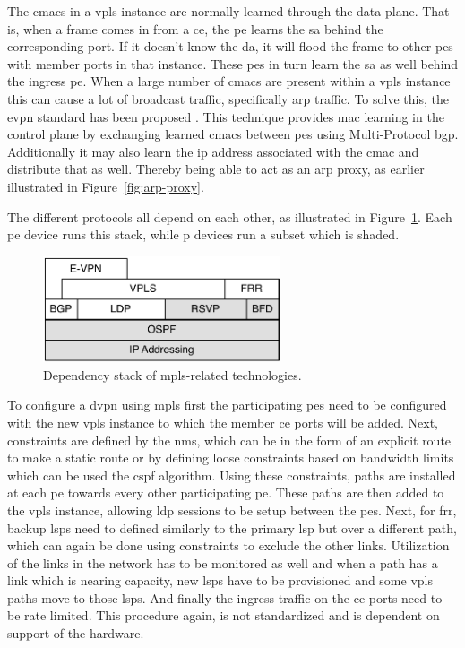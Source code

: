 The \acp{cmac} in a \ac{vpls} instance are normally learned through the data plane. That is, when a frame comes in from a \ac{ce}, the \ac{pe} learns the \ac{sa} behind the corresponding port. If it doesn't know the \ac{da}, it will flood the frame to other \acp{pe} with member ports in that instance. These \acp{pe} in turn learn the \ac{sa} as well behind the ingress \ac{pe}. When a large number of \acp{cmac} are present within a \ac{vpls} instance this can cause a lot of broadcast traffic, specifically \ac{arp} traffic. To solve this, the \ac{evpn} standard has been proposed \cite{evpn}. This technique provides \ac{mac} learning in the control plane by exchanging learned \acp{cmac} between \acp{pe} using Multi-Protocol \ac{bgp}. Additionally it may also learn the \ac{ip} address associated with the \ac{cmac} and distribute that as well. Thereby being able to act as an \ac{arp} proxy, as earlier illustrated in Figure~\ref{fig:arp-proxy}.

The different protocols all depend on each other, as illustrated in Figure~\ref{fig:mpls-stack}. Each \ac{pe} device runs this stack, while \ac{p} devices run a subset which is shaded. 

\begin{figure}[!h]
	\centering
	\includegraphics[width=7cm]{./includes/mpls-stack.pdf}
	\caption{Dependency stack of \ac{mpls}-related technologies.}
	\label{fig:mpls-stack}
\end{figure} 

To configure a \ac{dvpn} using \ac{mpls} first the participating \acp{pe} need to be configured with the new \ac{vpls} instance to which the member \ac{ce} ports will be added. Next, constraints are defined by the \ac{nms}, which can be in the form of an explicit route to make a static route or by defining loose constraints based on bandwidth limits which can be used the \ac{cspf} algorithm. Using these constraints, paths are installed at each \ac{pe} towards every other participating \ac{pe}. These paths are then added to the \ac{vpls} instance, allowing \ac{ldp} sessions to be setup between the \acp{pe}. Next, for \ac{frr}, backup \acp{lsp} need to defined similarly to the primary \ac{lsp} but over a different path, which can again be done using constraints to exclude the other links. Utilization of the links in the network has to be monitored as well and when a path has a link which is nearing capacity, new \acp{lsp} have to be provisioned and some \ac{vpls} paths move to those \acp{lsp}. And finally the ingress traffic on the \ac{ce} ports need to be rate limited. This procedure again, is not standardized and is dependent on support of the hardware.


